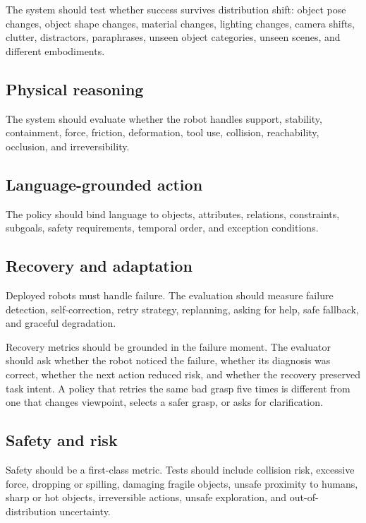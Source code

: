 \documentclass[sigconf,review,anonymous]{acmart}
\begin{document}
The system should test whether success survives distribution shift: object pose changes, object shape changes, material changes, lighting changes, camera shifts, clutter, distractors, paraphrases, unseen object categories, unseen scenes, and different embodiments.

\subsection{Physical reasoning}

The system should evaluate whether the robot handles support, stability, containment, force, friction, deformation, tool use, collision, reachability, occlusion, and irreversibility.

\subsection{Language-grounded action}

The policy should bind language to objects, attributes, relations, constraints, subgoals, safety requirements, temporal order, and exception conditions.

\subsection{Recovery and adaptation}

Deployed robots must handle failure. The evaluation should measure failure detection, self-correction, retry strategy, replanning, asking for help, safe fallback, and graceful degradation.

Recovery metrics should be grounded in the failure moment. The evaluator should ask whether the robot noticed the failure, whether its diagnosis was correct, whether the next action reduced risk, and whether the recovery preserved task intent. A policy that retries the same bad grasp five times is different from one that changes viewpoint, selects a safer grasp, or asks for clarification.

\subsection{Safety and risk}

Safety should be a first-class metric. Tests should include collision risk, excessive force, dropping or spilling, damaging fragile objects, unsafe proximity to humans, sharp or hot objects, irreversible actions, unsafe exploration, and out-of-distribution uncertainty.
\end{document}
